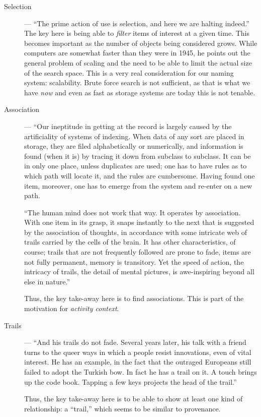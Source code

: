 \begin{description}
    \item[Selection] --- ``The prime action of use is selection, and here we are
        halting indeed.'' The key here is being able to \emph{filter} items of
        interest at a given time. This becomes important as the number of objects
        being considered grows.  While computers are somewhat faster than they were
        in 1945, he points out the general problem of scaling and the need to be
        able to limit the actual size of the search space.  This is a very real
        consideration for our naming system: scalability.  Brute force search is not
        sufficient, as that is what we have \emph{now} and even as fast as storage
        systems are today this is not tenable.

    \item[Association] --- ``Our ineptitude in getting at the record is largely
        caused by the artificiality of systems of indexing. When data of any
        sort are placed in storage, they are filed alphabetically or numerically, and
        information is found (when it is) by tracing it down from subclass to
        subclass. It can be in only one place, unless duplicates are used; one
        has to have rules as to which path will locate it, and the rules are
        cumbersome. Having found one item, moreover, one has to emerge from the
        system and re-enter on a new path.

        ``The human mind does not work that way. It operates by association. With one
        item in its grasp, it snaps instantly to the next that is suggested by the
        association of thoughts, in accordance with some intricate web of trails
        carried by the cells of the brain. It has other characteristics, of course;
        trails that are not frequently followed are prone to fade, items are not
        fully permanent, memory is transitory. Yet the speed of action, the
        intricacy of trails, the detail of mental pictures, is awe-inspiring beyond
        all else in nature.''

        Thus, the key take-away here is to find associations.  This is part of
        the motivation for \emph{activity context}.

    \item[Trails] --- ``And his trails do not fade. Several years later, his
        talk with a friend turns to the queer ways in which a people resist
        innovations, even of vital interest. He has an example, in the fact that the
        outraged Europeans still failed to adopt the Turkish bow. In fact he has a
        trail on it. A touch brings up the code book. Tapping a few keys projects
        the head of the trail.''

        Thus, the key take-away here is to be able to show at least one kind of
        relationship: a ``trail,'' which seems to be similar to provenance.

\end{description}



